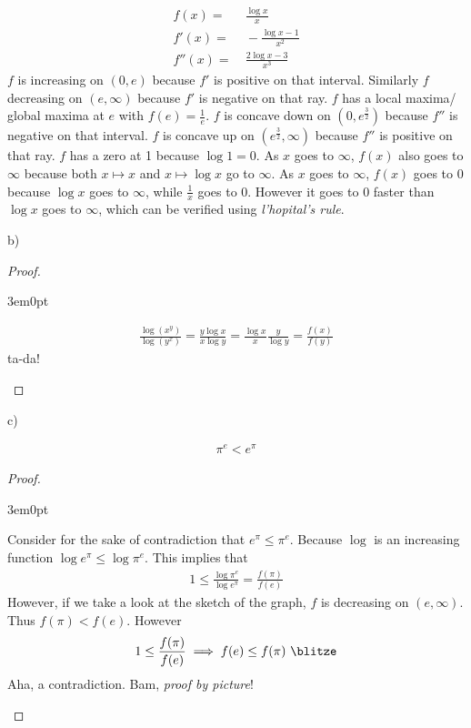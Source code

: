\documentclass[11pt]{article}
\newenvironment{myproof}
{\begin{proof} \begin{adjustwidth}{3em}{0pt}$ $\par\nobreak\ignorespaces}
{\end{adjustwidth} \end{proof}}
\begin{document}
\begin{flushleft}
\begin{align*}
f(x) = & \ \frac{\log x}{x}\\
f'(x) = & \ - \frac{\log x - 1}{x^2} \\
f''(x) = & \ \frac{2 \log x -3}{x^3}
\end{align*}
$f$ is increasing on $(0, e)$ because $f'$ is positive on that interval. Similarly $f$ decreasing on $(e, \infty)$ because $f'$ is negative on that ray. $f$ has a local maxima/ global maxima at $e$ with $f(e) = \frac1e$. $f$ is concave down on $(0, e^\frac32)$ because $f''$ is negative on that interval. $f$ is concave up on $(e^\frac32,\infty)$ because $f''$ is positive on that ray. $f$ has a zero at 1 because $\log 1 = 0$. As $x$ goes to $\infty$, $f(x)$ also goes to $\infty$ because both $x \mapsto x$ and $x \mapsto \log x$ go to $\infty$. As $x$ goes to $\infty$, $f(x)$ goes to 0 because $\log x$ goes to $\infty$, while $\frac1x$ goes to 0. However it goes to 0 faster than $\log x$ goes to $\infty$, which can be verified using \textit{l'hopital's rule}.

b)

\begin{myproof}
\begin{align*}
\frac{\log(x^y)}{\log(y^x)} = \frac{y \log x}{x \log y} = \frac{\log x}{x} \frac{y}{\log y} = \frac{f(x)}{f(y)}
\end{align*}
ta-da!
\end{myproof}

c)

\begin{align*}
\pi^e < e^\pi
\end{align*}

\begin{myproof}
Consider for the sake of contradiction that $ e^\pi \leq \pi^e$. Because $\log$ is an increasing function $\log e^\pi \leq \log \pi^e$. This implies that 
\begin{align*}
1 \leq \frac{\log \pi^e}{\log e^\pi} = \frac{f(\pi)}{f(e)}
\end{align*}
However, if we take a look at the sketch of the graph, $f$ is decreasing on $(e, \infty)$. Thus $f(\pi) < f(e)$. However
\begin{align*}
1 \leq \frac{f(\pi)}{f(e)} \implies f(e) \leq f(\pi) \text{ \blitze}
\end{align*}
Aha, a contradiction. Bam, \textit{proof by picture}!
\end{myproof}

\newpage


\end{flushleft}
\end{document}
